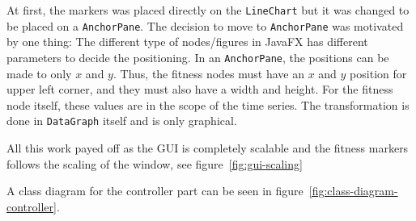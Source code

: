 At first, the markers was placed directly on the \texttt{LineChart} but it
was changed to be placed on a \texttt{AnchorPane}. The decision to move to
\texttt{AnchorPane} was motivated by one thing: The different type of
nodes/figures in JavaFX has different parameters to decide the positioning. In
an \texttt{AnchorPane}, the positions can be made to only $x$ and $y$. Thus, the
fitness nodes must have an $x$ and $y$ position for upper left corner, and they
must also have a width and height. For the fitness node itself, these values are
in the scope of the time series. The transformation is done in
\texttt{DataGraph} itself
and is only graphical. 

All this work payed off as the GUI is completely scalable and the fitness
markers follows the scaling of the window, see figure~\ref{fig:gui-scaling}

A class diagram for the controller part can be seen in
figure~\ref{fig:class-diagram-controller}. 

